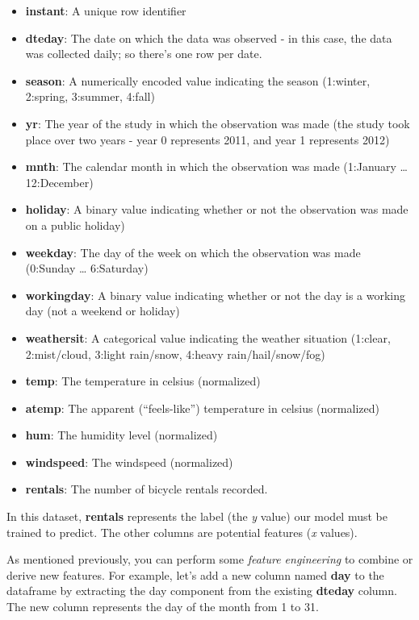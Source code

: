 \documentclass[11pt]{article}
\providecommand{\tightlist}{%
      \setlength{\itemsep}{0pt}\setlength{\parskip}{0pt}}
\begin{document}
\begin{itemize}
\tightlist
\item
  \textbf{instant}: A unique row identifier
\item
  \textbf{dteday}: The date on which the data was observed - in this
  case, the data was collected daily; so there's one row per date.
\item
  \textbf{season}: A numerically encoded value indicating the season
  (1:winter, 2:spring, 3:summer, 4:fall)
\item
  \textbf{yr}: The year of the study in which the observation was made
  (the study took place over two years - year 0 represents 2011, and
  year 1 represents 2012)
\item
  \textbf{mnth}: The calendar month in which the observation was made
  (1:January \ldots{} 12:December)
\item
  \textbf{holiday}: A binary value indicating whether or not the
  observation was made on a public holiday)
\item
  \textbf{weekday}: The day of the week on which the observation was
  made (0:Sunday \ldots{} 6:Saturday)
\item
  \textbf{workingday}: A binary value indicating whether or not the day
  is a working day (not a weekend or holiday)
\item
  \textbf{weathersit}: A categorical value indicating the weather
  situation (1:clear, 2:mist/cloud, 3:light rain/snow, 4:heavy
  rain/hail/snow/fog)
\item
  \textbf{temp}: The temperature in celsius (normalized)
\item
  \textbf{atemp}: The apparent (``feels-like'') temperature in celsius
  (normalized)
\item
  \textbf{hum}: The humidity level (normalized)
\item
  \textbf{windspeed}: The windspeed (normalized)
\item
  \textbf{rentals}: The number of bicycle rentals recorded.
\end{itemize}

In this dataset, \textbf{rentals} represents the label (the \emph{y}
value) our model must be trained to predict. The other columns are
potential features (\emph{x} values).

As mentioned previously, you can perform some \emph{feature engineering}
to combine or derive new features. For example, let's add a new column
named \textbf{day} to the dataframe by extracting the day component from
the existing \textbf{dteday} column. The new column represents the day
of the month from 1 to 31.
\end{document}
